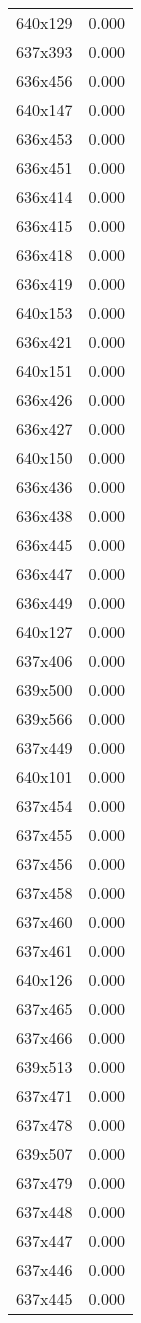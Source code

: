 \begin{table}
\begin{tabular}{lr}
640x129 & 0.000 \\
637x393 & 0.000 \\
636x456 & 0.000 \\
640x147 & 0.000 \\
636x453 & 0.000 \\
636x451 & 0.000 \\
636x414 & 0.000 \\
636x415 & 0.000 \\
636x418 & 0.000 \\
636x419 & 0.000 \\
640x153 & 0.000 \\
636x421 & 0.000 \\
640x151 & 0.000 \\
636x426 & 0.000 \\
636x427 & 0.000 \\
640x150 & 0.000 \\
636x436 & 0.000 \\
636x438 & 0.000 \\
636x445 & 0.000 \\
636x447 & 0.000 \\
636x449 & 0.000 \\
640x127 & 0.000 \\
637x406 & 0.000 \\
639x500 & 0.000 \\
639x566 & 0.000 \\
637x449 & 0.000 \\
640x101 & 0.000 \\
637x454 & 0.000 \\
637x455 & 0.000 \\
637x456 & 0.000 \\
637x458 & 0.000 \\
637x460 & 0.000 \\
637x461 & 0.000 \\
640x126 & 0.000 \\
637x465 & 0.000 \\
637x466 & 0.000 \\
639x513 & 0.000 \\
637x471 & 0.000 \\
637x478 & 0.000 \\
639x507 & 0.000 \\
637x479 & 0.000 \\
637x448 & 0.000 \\
637x447 & 0.000 \\
637x446 & 0.000 \\
637x445 & 0.000 \\

\end{tabular}
\end{table}
